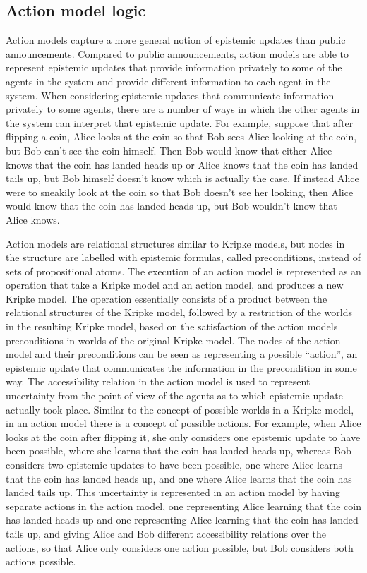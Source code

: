 \subsection{Action model logic}

Action models capture a more general notion of epistemic updates than public announcements.
Compared to public announcements, action models are able to represent epistemic updates that provide information privately to some of the agents in the system and provide different information to each agent in the system.
When considering epistemic updates that communicate information privately to some agents, there are a number of ways in which the other agents in the system can interpret that epistemic update. 
For example, suppose that after flipping a coin, Alice looks at the coin so that Bob sees Alice looking at the coin, but Bob can't see the coin himself. Then Bob would know that either Alice knows that the coin has landed heads up or Alice knows that the coin has landed tails up, but Bob himself doesn't know which is actually the case.
If instead Alice were to sneakily look at the coin so that Bob doesn't see her looking, then Alice would know that the coin has landed heads up, but Bob wouldn't know that Alice knows.

Action models are relational structures similar to Kripke models, but nodes in the structure are labelled with epistemic formulas, called preconditions, instead of sets of propositional atoms.
The execution of an action model is represented as an operation that take a Kripke model and an action model, and produces a new Kripke model.
The operation essentially consists of a product between the relational structures of the Kripke model, followed by a restriction of the worlds in the resulting Kripke model, based on the satisfaction of the action models preconditions in worlds of the original Kripke model.
The nodes of the action model and their preconditions can be seen as representing a possible ``action'', an epistemic update that communicates the information in the precondition in some way.
The accessibility relation in the action model is used to represent uncertainty from the point of view of the agents as to which epistemic update actually took place.
Similar to the concept of possible worlds in a Kripke model, in an action model there is a concept of possible actions.
For example, when Alice looks at the coin after flipping it, she only considers one epistemic update to have been possible, where she learns that the coin has landed heads up, whereas Bob considers two epistemic updates to have been possible, one where Alice learns that the coin has landed heads up, and one where Alice learns that the coin has landed tails up.
This uncertainty is represented in an action model by having separate actions in the action model, one representing Alice learning that the coin has landed heads up and one representing Alice learning that the coin has landed tails up, and giving Alice and Bob different accessibility relations over the actions, so that Alice only considers one action possible, but Bob considers both actions possible.

